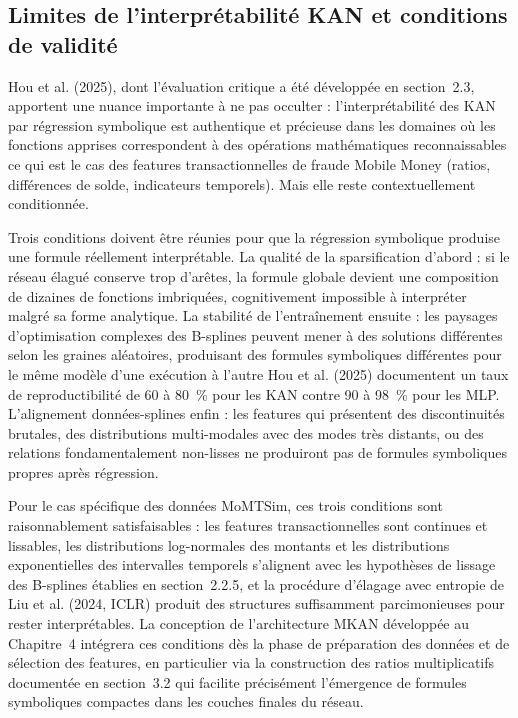 \documentclass[11pt,a4paper,oneside]{report}
\theoremstyle{definition}
\theoremstyle{remark}
\begin{document}
\subsection{Limites de l'interprétabilité KAN et conditions de validité}

Hou et al. (2025), dont l'évaluation critique a été développée en section~2.3, apportent une nuance importante à ne pas occulter : l'interprétabilité des KAN par régression symbolique est authentique et précieuse dans les domaines où les fonctions apprises correspondent à des opérations mathématiques reconnaissables  ce qui est le cas des features transactionnelles de fraude Mobile Money (ratios, différences de solde, indicateurs temporels). Mais elle reste contextuellement conditionnée.

Trois conditions doivent être réunies pour que la régression symbolique produise une formule réellement interprétable. La qualité de la sparsification d'abord : si le réseau élagué conserve trop d'arêtes, la formule globale devient une composition de dizaines de fonctions imbriquées, cognitivement impossible à interpréter malgré sa forme analytique. La stabilité de l'entraînement ensuite : les paysages d'optimisation complexes des B-splines peuvent mener à des solutions différentes selon les graines aléatoires, produisant des formules symboliques différentes pour le même modèle d'une exécution à l'autre  Hou et al. (2025) documentent un taux de reproductibilité de 60 à 80~\% pour les KAN contre 90 à 98~\% pour les MLP. L'alignement données-splines enfin : les features qui présentent des discontinuités brutales, des distributions multi-modales avec des modes très distants, ou des relations fondamentalement non-lisses ne produiront pas de formules symboliques propres après régression.

Pour le cas spécifique des données MoMTSim, ces trois conditions sont raisonnablement satisfaisables : les features transactionnelles sont continues et lissables, les distributions log-normales des montants et les distributions exponentielles des intervalles temporels s'alignent avec les hypothèses de lissage des B-splines établies en section~2.2.5, et la procédure d'élagage avec entropie de Liu et al. (2024, ICLR) produit des structures suffisamment parcimonieuses pour rester interprétables. La conception de l'architecture MKAN développée au Chapitre~4 intégrera ces conditions dès la phase de préparation des données et de sélection des features, en particulier via la construction des ratios multiplicatifs documentée en section~3.2 qui facilite précisément l'émergence de formules symboliques compactes dans les couches finales du réseau.
\end{document}
